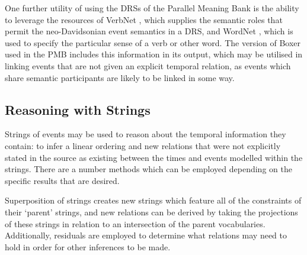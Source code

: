 \documentclass[a4paper,12pt,leqno]{article}
\begin{document}
One further utility of using the DRSs of the Parallel Meaning Bank is the ability to leverage the resources of VerbNet \citep{schuler2005verbnet}, which supplies the semantic roles that permit the neo-Davidsonian event semantics in a DRS, and WordNet \citep{fellbaum2010wordnet}, which is used to specify the particular sense of a verb or other word. The version of Boxer used in the PMB includes this information in its output, which may be utilised in linking events that are not given an explicit temporal relation, as events which share semantic participants are likely to be linked in some way.



\subsection{Reasoning with Strings}\label{sub:reasoning}
Strings of events may be used to reason about the temporal information they contain: to infer a linear ordering and new relations that were not explicitly stated in the source as existing between the times and events modelled within the strings. There are a number methods which can be employed depending on the specific results that are desired.

Superposition of strings creates new strings which feature all of the constraints of their `parent' strings, and new relations can be derived by taking the projections of these strings in relation to an intersection of the parent vocabularies. %
Additionally, residuals are employed to determine what relations may need to hold in order for other inferences to be made.
\end{document}
